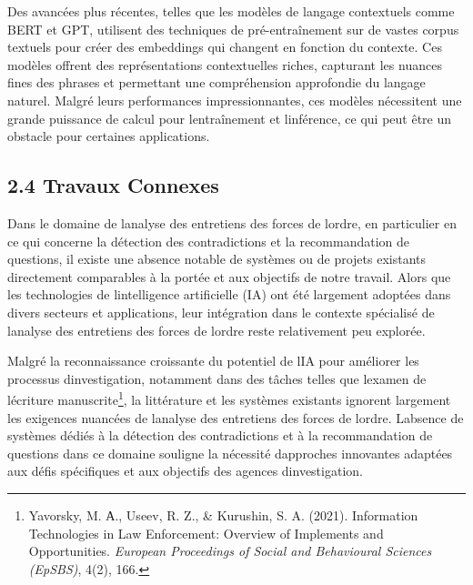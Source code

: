 \documentclass[
]{article}
\begin{document}
Des avancées plus récentes, telles que les modèles de langage
contextuels comme BERT et GPT, utilisent des techniques de
pré-entraînement sur de vastes corpus textuels pour créer des embeddings
qui changent en fonction du contexte. Ces modèles offrent des
représentations contextuelles riches, capturant les nuances fines des
phrases et permettant une compréhension approfondie du langage naturel.
Malgré leurs performances impressionnantes, ces modèles nécessitent une
grande puissance de calcul pour l\textquotesingle entraînement et
l\textquotesingle inférence, ce qui peut être un obstacle pour certaines
applications.

\subsection{\texorpdfstring{2.4 \textbf{Travaux
Connexes}}{2.4 Travaux Connexes}}\label{travaux-connexes}

Dans le domaine de l\textquotesingle analyse des entretiens des forces
de l\textquotesingle ordre, en particulier en ce qui concerne la
détection des contradictions et la recommandation de questions, il
existe une absence notable de systèmes ou de projets existants
directement comparables à la portée et aux objectifs de notre travail.
Alors que les technologies de l\textquotesingle intelligence
artificielle (IA) ont été largement adoptées dans divers secteurs et
applications, leur intégration dans le contexte spécialisé de
l\textquotesingle analyse des entretiens des forces de
l\textquotesingle ordre reste relativement peu explorée.

Malgré la reconnaissance croissante du potentiel de l\textquotesingle IA
pour améliorer les processus d\textquotesingle investigation, notamment
dans des tâches telles que l\textquotesingle examen de
l\textquotesingle écriture manuscrite\footnote{Yavorsky, M. А., Useev,
  R. Z., \& Kurushin, S. A. (2021). Information Technologies in Law
  Enforcement: Overview of Implements and Opportunities. \emph{European
  Proceedings of Social and Behavioural Sciences (EpSBS)}, 4(2), 166.},
la littérature et les systèmes existants ignorent largement les
exigences nuancées de l\textquotesingle analyse des entretiens des
forces de l\textquotesingle ordre. L\textquotesingle absence de systèmes
dédiés à la détection des contradictions et à la recommandation de
questions dans ce domaine souligne la nécessité
d\textquotesingle approches innovantes adaptées aux défis spécifiques et
aux objectifs des agences d\textquotesingle investigation.
\end{document}
